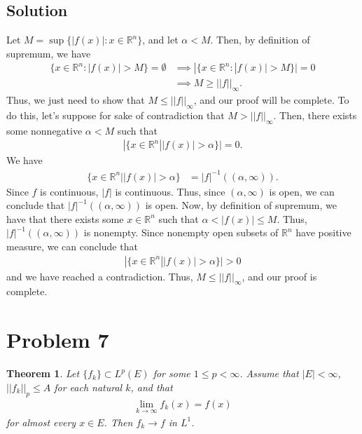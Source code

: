 \documentclass[10pt,a4paper]{article}
\theoremstyle{theorem}
\newtheorem{theorem}{Theorem}
\theoremstyle{definition}
\begin{document}
\subsection*{Solution}
Let $M = \sup \{|f(x)| : x \in \mathbb{R}^n \}$, and let $\alpha < M$. Then, by definition of supremum, we have
\begin{align*}
\{x \in \mathbb{R}^n : |f(x)| > M \} = \emptyset &\implies |\{x \in \mathbb{R}^n : |f(x)| > M \}| = 0\\
&\implies M \geq ||f||_\infty.
\end{align*}
Thus, we just need to show that $M \leq ||f||_\infty$, and our proof will be complete. To do this, let's suppose for sake of contradiction that $M > ||f||_\infty$. Then, there exists some nonnegative $\alpha < M$ such that 
\begin{align*}
|\{x \in \mathbb{R}^n| |f(x)| > \alpha \}| = 0.
\end{align*}
We have
\begin{align*}
\{x \in \mathbb{R}^n| |f(x)| > \alpha \} &= |f|^{-1}((\alpha, \infty)).
\end{align*}
Since $f$ is continuous, $|f|$ is continuous. Thus, since $(\alpha, \infty)$ is open, we can conclude that $|f|^{-1}((\alpha, \infty))$ is open. Now, by definition of supremum, we have that there exists some $x \in \mathbb{R}^n$ such that $\alpha < |f(x)| \leq M$. Thus, $|f|^{-1}((\alpha, \infty))$ is nonempty. Since nonempty open subsets of $\mathbb{R}^n$ have positive measure, we can conclude that
\begin{align*}
|\{x \in \mathbb{R}^n| |f(x)| > \alpha \}| > 0
\end{align*}
and we have reached a contradiction. Thus, $M \leq ||f||_\infty$, and our proof is complete.

\section*{Problem 7}
\begin{theorem}
Let $\{f_k\} \subset L^p(E)$ for some $1 \leq p < \infty$. Assume that $|E| < \infty$, $||f_k||_p \leq A$ for each natural $k$, and that 
\begin{align*}
\lim_{k \to \infty} f_k(x) = f(x)
\end{align*}
for almost every $x \in E$. Then $f_k \to f$ in $L^1$.
\end{theorem}
\end{document}
